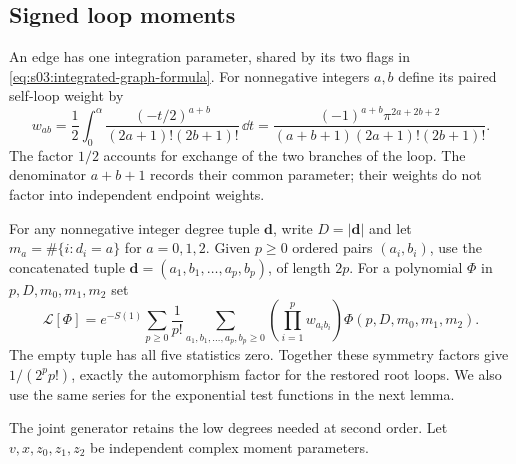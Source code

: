 \subsection{Signed loop moments}
\label{subsec:s04:01}

An edge has one integration parameter, shared by its two flags in
\eqref{eq:s03:integrated-graph-formula}. For nonnegative integers
$a,b$ define its paired self-loop weight by
\begin{equation}\label{eq:s04:paired-weight}
 w_{ab}=\frac12\int_0^\alpha
       \frac{(-t/2)^{a+b}}{(2a+1)!(2b+1)!}\,\dd t
 =\frac{(-1)^{a+b}\pi^{2a+2b+2}}
       {(a+b+1)(2a+1)!(2b+1)!}.
\end{equation}
The factor $1/2$ accounts for exchange of the two branches of the loop. The denominator
$a+b+1$ records their common parameter; their weights do not factor
into independent endpoint weights.

For any nonnegative integer degree tuple $\mathbf d$, write
$D=|\mathbf d|$ and let
$m_a=\#\{i:d_i=a\}$ for $a=0,1,2$. Given $p\geq0$ ordered pairs
$(a_i,b_i)$, use the concatenated tuple
$\mathbf d=(a_1,b_1,\ldots,a_p,b_p)$, of length $2p$.
For a polynomial $\Phi$ in $p,D,m_0,m_1,m_2$ set
\begin{equation}\label{eq:s04:loop-functional}
 \mathcal L[\Phi]=e^{-S(1)}\sum_{p\geq0}\frac1{p!}
 \sum_{a_1,b_1,\ldots,a_p,b_p\geq0}
   \left(\prod_{i=1}^p w_{a_i b_i}\right)
       \Phi(p,D,m_0,m_1,m_2).
\end{equation}
The empty tuple has all five statistics zero. Together these symmetry
factors give $1/(2^pp!)$, exactly the automorphism factor for the
restored root loops. We also use the same series for the exponential
test functions in the next lemma.

The joint generator retains the low degrees needed at second order.
Let $v,x,z_0,z_1,z_2$ be independent complex moment parameters.

